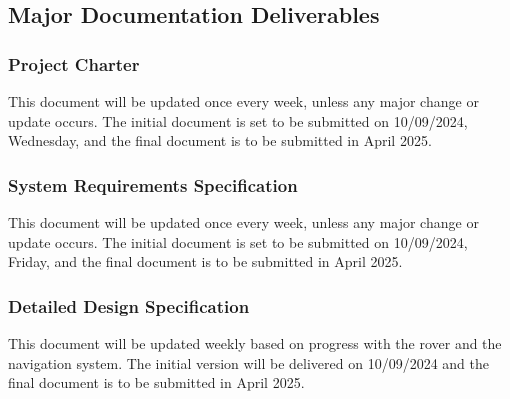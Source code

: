 
\subsection{Major Documentation Deliverables}

\subsubsection{Project Charter}
This document will be updated once every week, unless any major change or update occurs. The initial document is set to be submitted on 10/09/2024, Wednesday, and the final document is to be submitted in April 2025.

\subsubsection{System Requirements Specification}
This document will be updated once every week, unless any major change or update occurs. The initial document is set to be submitted on 10/09/2024, Friday, and the final document is to be submitted in April 2025.


\subsubsection{Detailed Design Specification}
This document will be updated weekly based on progress with the rover and the navigation system. The initial version will be delivered on 10/09/2024 and the final document is to be submitted in April 2025.

